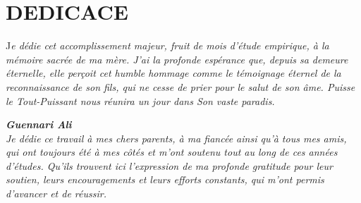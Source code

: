 \chapter*{DEDICACE}
\thispagestyle{MyStyle}
%
\begin{center}
{\huge J}\normalfont\large\itshape{}e dédie cet accomplissement majeur, fruit de mois d'étude empirique, à la mémoire sacrée de ma mère. J'ai la profonde espérance que, depuis sa demeure éternelle, elle perçoit cet humble hommage comme le témoignage éternel de la reconnaissance de son fils, qui ne cesse de prier pour le salut de son âme. Puisse le Tout-Puissant nous réunira un jour dans Son vaste paradis.\par

\raggedleft\normalfont\large\itshape{}\textbf{Guennari Ali} \\

{\huge J}\normalfont\large\itshape{}e dédie ce travail à mes chers parents, à ma fiancée ainsi qu’à tous mes amis, qui ont toujours été à mes côtés et m’ont soutenu tout au long de ces années d’études. Qu’ils trouvent ici l’expression de ma profonde gratitude pour leur soutien, leurs encouragements et leurs efforts constants, qui m’ont permis d’avancer et de réussir.\par

\end{center}
%